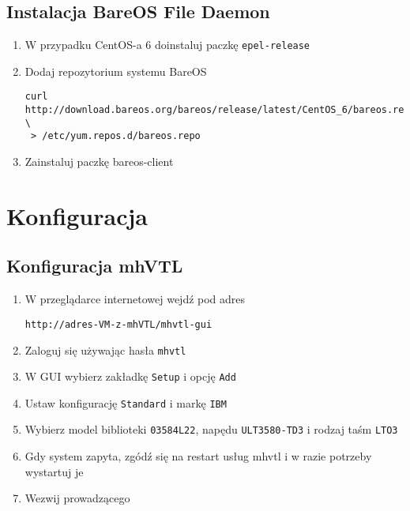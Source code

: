 \documentclass[polish]{article}
\begin{document}
\subsection*{Instalacja BareOS File Daemon}

\begin{enumerate}

\item W przypadku CentOS-a 6 doinstaluj paczkę \texttt{epel-release}

\item Dodaj repozytorium systemu BareOS
\begin{verbatim}
curl http://download.bareos.org/bareos/release/latest/CentOS_6/bareos.repo \
 > /etc/yum.repos.d/bareos.repo
\end{verbatim}

\item Zainstaluj paczkę bareos-client

\end{enumerate}


\section{Konfiguracja}


\subsection*{Konfiguracja mhVTL}

\begin{enumerate}

\item W przeglądarce internetowej wejdź pod adres
\begin{verbatim}
http://adres-VM-z-mhVTL/mhvtl-gui
\end{verbatim}

\item Zaloguj się używając hasła \texttt{mhvtl}

\item W GUI wybierz zakładkę \texttt{Setup} i opcję \texttt{Add}

\item Ustaw konfigurację \texttt{Standard} i markę \texttt{IBM}

\item Wybierz model biblioteki \texttt{03584L22}, napędu \texttt{ULT3580-TD3} i rodzaj taśm \texttt{LTO3}

\item Gdy system zapyta, zgódź się na restart usług mhvtl i w razie potrzeby wystartuj je

\item Wezwij prowadzącego

\end{enumerate}
\end{document}
